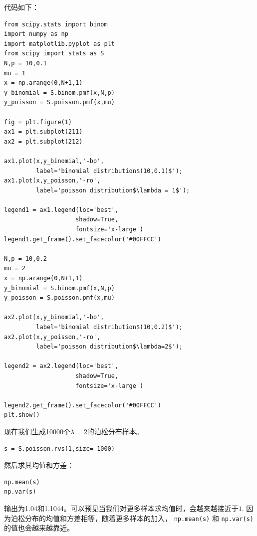 \documentclass[10pt,a4paper,UTF8]{article}
\begin{document}
代码如下：

\lstset{language=Python,label= ,caption= ,captionpos=b,firstnumber=1,numbers=left}
\begin{lstlisting}
from scipy.stats import binom
import numpy as np
import matplotlib.pyplot as plt
from scipy import stats as S
N,p = 10,0.1
mu = 1
x = np.arange(0,N+1,1)
y_binomial = S.binom.pmf(x,N,p)
y_poisson = S.poisson.pmf(x,mu)

fig = plt.figure(1)
ax1 = plt.subplot(211)
ax2 = plt.subplot(212)

ax1.plot(x,y_binomial,'-bo',
         label='binomial distribution$(10,0.1)$');
ax1.plot(x,y_poisson,'-ro',
         label='poisson distribution$\lambda = 1$');

legend1 = ax1.legend(loc='best',
                    shadow=True,
                    fontsize='x-large')
legend1.get_frame().set_facecolor('#00FFCC')

N,p = 10,0.2
mu = 2
x = np.arange(0,N+1,1)
y_binomial = S.binom.pmf(x,N,p)
y_poisson = S.poisson.pmf(x,mu)

ax2.plot(x,y_binomial,'-bo',
         label='binomial distribution$(10,0.2)$');
ax2.plot(x,y_poisson,'-ro',
         label='poisson distribution$\lambda=2$');

legend2 = ax2.legend(loc='best',
                    shadow=True,
                    fontsize='x-large')

legend2.get_frame().set_facecolor('#00FFCC')
plt.show()
\end{lstlisting}

现在我们生成10000个\(\lambda=2\)的泊松分布样本。
\lstset{language=Python,label= ,caption= ,captionpos=b,numbers=none}
\begin{lstlisting}
s = S.poisson.rvs(1,size= 1000)
\end{lstlisting}
然后求其均值和方差：
\lstset{language=Python,label= ,caption= ,captionpos=b,numbers=none}
\begin{lstlisting}
np.mean(s)
np.var(s)
\end{lstlisting}
输出为1.04和1.1044。可以预见当我们对更多样本求均值时，会越来越接近于\(1\). 因为泊松分布的均值和方差相等，随着更多样本的加入， \texttt{np.mean(s)} 和 \texttt{np.var(s)} 的值也会越来越靠近。
\end{document}
